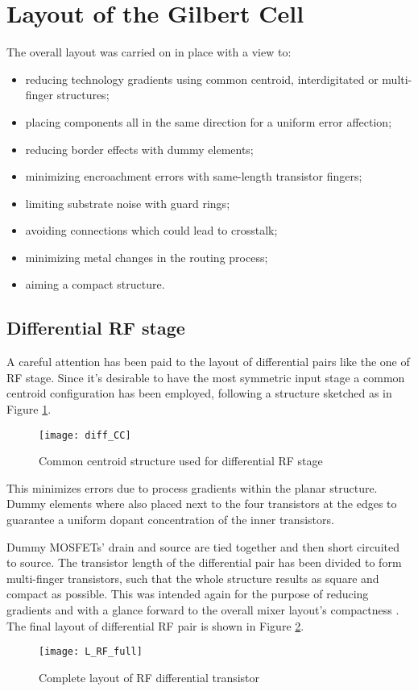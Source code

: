 \section{Layout of the Gilbert Cell}
The overall layout was carried on in place with a view to:
\begin{itemize}
	\item reducing technology gradients using common centroid, interdigitated or multi-finger structures;
	\item placing components all in the same direction for a uniform error affection;
	\item reducing border effects with dummy elements;
	\item minimizing encroachment errors with same-length transistor fingers;
 	\item limiting substrate noise with guard rings;
	\item avoiding connections which could lead to crosstalk;
	\item minimizing metal changes in the routing process;
	\item aiming a compact structure.
\end{itemize}
\subsection{Differential RF stage}
A careful attention has been paid to the layout of differential pairs like the one of RF stage. Since it's desirable to have the most symmetric input stage a common centroid configuration has been employed, following a structure sketched as in Figure \ref{fig:diff_CC}. 

\begin{figure}[H]
	\centering
	\texttt{[image: diff\_CC]}
	\caption{Common centroid structure used for differential RF stage}
	\label{fig:diff_CC}
\end{figure}
This minimizes errors due to process gradients within the planar structure. Dummy elements where also placed next to the four transistors at the edges to guarantee a uniform dopant concentration of the inner transistors.

Dummy MOSFETs' drain and source are tied together and then short circuited to source.
The transistor length of the differential pair has been divided to form multi-finger  transistors, such that the whole structure results as square and compact as possible. This was intended again for the purpose of reducing gradients and with a glance forward to the overall mixer layout's compactness . The final layout of differential RF pair is shown in Figure \ref{L_RF_full}.
\begin{figure}[H]
	\centering
	\texttt{[image: L\_RF\_full]}
	\caption{Complete layout of RF differential transistor}
	\label{L_RF_full}
\end{figure}

